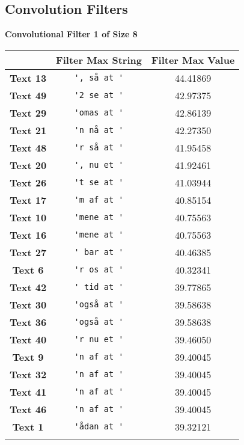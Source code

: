 \subsection{Convolution	Filters}
\begin{table}
    \centering
    \textbf{Convolutional Filter 1 of Size 8}\par\medskip
    \begin{tabular}{c|cc}
        & \textbf{Filter Max String} & \textbf{Filter Max Value} \\ \hline
        \textbf{Text 13}  & \verb{', så at '{  & 44.41869 \\
        \textbf{Text 49}  & \verb{'2 se at '{  & 42.97375 \\
        \textbf{Text 29}  & \verb{'omas at '{  & 42.86139 \\
        \textbf{Text 21}  & \verb{'n nå at '{  & 42.27350 \\
        \textbf{Text 48}  & \verb{'r så at '{  & 41.95458 \\
        \textbf{Text 20}  & \verb{', nu et '{  & 41.92461 \\
        \textbf{Text 26}  & \verb{'t se at '{  & 41.03944 \\
        \textbf{Text 17}  & \verb{'m af at '{  & 40.85154 \\
        \textbf{Text 10}  & \verb{'mene at '{  & 40.75563 \\
        \textbf{Text 16}  & \verb{'mene at '{  & 40.75563 \\
        \textbf{Text 27}  & \verb{' bar at '{  & 40.46385 \\
        \textbf{Text 6}   & \verb{'r os at '{  & 40.32341 \\
        \textbf{Text 42}  & \verb{' tid at '{  & 39.77865 \\
        \textbf{Text 30}  & \verb{'også at '{  & 39.58638 \\
        \textbf{Text 36}  & \verb{'også at '{  & 39.58638 \\
        \textbf{Text 40}  & \verb{'r nu et '{  & 39.46050 \\
        \textbf{Text 9}   & \verb{'n af at '{  & 39.40045 \\
        \textbf{Text 32}  & \verb{'n af at '{  & 39.40045 \\
        \textbf{Text 41}  & \verb{'n af at '{  & 39.40045 \\
        \textbf{Text 46}  & \verb{'n af at '{  & 39.40045 \\
        \textbf{Text 1}   & \verb{'ådan at '{  & 39.32121 \\
}}}}}}}}}}}}}}}}}}}}}
\end{tabular}
\end{table}
